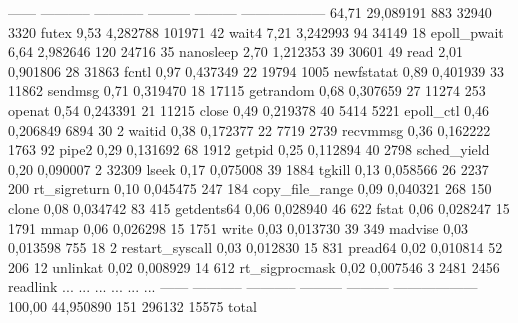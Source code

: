 \begin{myverbatim}
------ ----------- ----------- --------- --------- ------------------
 64,71   29,089191         883     32940      3320 futex
  9,53    4,282788      101971        42           wait4
  7,21    3,242993          94     34149        18 epoll_pwait
  6,64    2,982646         120     24716        35 nanosleep
  2,70    1,212353          39     30601        49 read
  2,01    0,901806          28     31863           fcntl
  0,97    0,437349          22     19794      1005 newfstatat
  0,89    0,401939          33     11862           sendmsg
  0,71    0,319470          18     17115           getrandom
  0,68    0,307659          27     11274       253 openat
  0,54    0,243391          21     11215           close
  0,49    0,219378          40      5414      5221 epoll_ctl
  0,46    0,206849        6894        30         2 waitid
  0,38    0,172377          22      7719      2739 recvmmsg
  0,36    0,162222        1763        92           pipe2
  0,29    0,131692          68      1912           getpid
  0,25    0,112894          40      2798           sched_yield
  0,20    0,090007           2     32309           lseek
  0,17    0,075008          39      1884           tgkill
  0,13    0,058566          26      2237       200 rt_sigreturn
  0,10    0,045475         247       184           copy_file_range
  0,09    0,040321         268       150           clone
  0,08    0,034742          83       415           getdents64
  0,06    0,028940          46       622           fstat
  0,06    0,028247          15      1791           mmap
  0,06    0,026298          15      1751           write
  0,03    0,013730          39       349           madvise
  0,03    0,013598         755        18         2 restart_syscall
  0,03    0,012830          15       831           pread64
  0,02    0,010814          52       206        12 unlinkat
  0,02    0,008929          14       612           rt_sigprocmask
  0,02    0,007546           3      2481      2456 readlink
   ...         ...         ...       ...       ... ...   
------ ----------- ----------- --------- --------- ------------------
100,00   44,950890         151    296132     15575 total
\end{myverbatim}